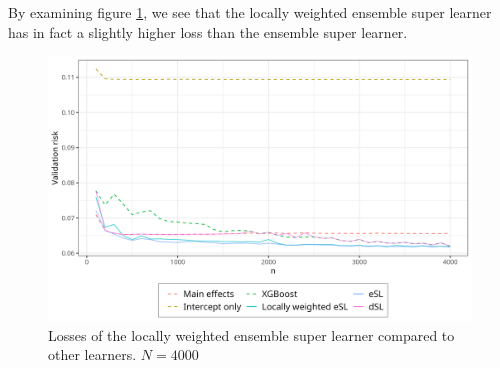 \documentclass[./main.tex]{subfiles}
\begin{document}
By examining figure \ref{fig:losses_esl_lw}, we see that the locally weighted ensemble super learner has in fact a slightly higher loss than the ensemble super learner.
\begin{figure}[H]
    \centering
    \includegraphics[width=\textwidth]{figures/losses_esl_lw.png}
    \caption{Losses of the locally weighted ensemble super learner compared to other learners. $ N = 4000 $}
    \label{fig:losses_esl_lw}
\end{figure}
\end{document}
